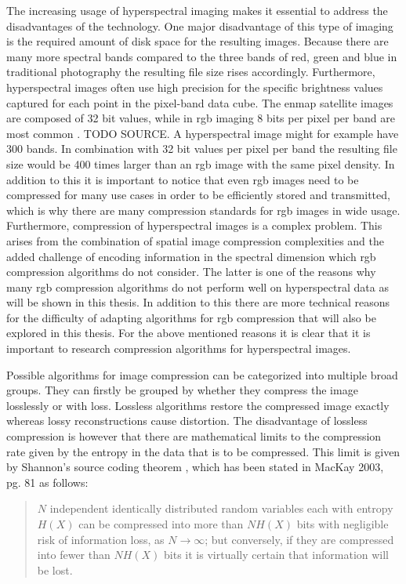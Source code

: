 The increasing usage of hyperspectral imaging makes it essential to address the disadvantages of the technology. One major disadvantage of this type of imaging is the required amount of disk space for the resulting images. Because there are many more spectral bands compared to the three bands of red, green and blue in traditional photography the resulting file size rises accordingly. Furthermore, hyperspectral images often use high precision for the specific brightness values captured for each point in the pixel-band data cube. The \ac{enmap} satellite images are composed of 32 bit values, while in \ac{rgb} imaging 8 bits per pixel per band are most common \citep{guanter_enmap_2015}. TODO SOURCE. A hyperspectral image might for example have 300 bands. In combination with 32 bit values per pixel per band the resulting file size would be 400 times larger than an \ac{rgb} image with the same pixel density. In addition to this it is important to notice that even \ac{rgb} images need to be compressed for many use cases in order to be efficiently stored and transmitted, which is why there are many compression standards for \ac{rgb} images in wide usage.
Furthermore, compression of hyperspectral images is a complex problem. This arises from the combination of spatial image compression complexities and the added challenge of encoding information in the spectral dimension which \ac{rgb} compression algorithms do not consider. The latter is one of the reasons why many \ac{rgb} compression algorithms do not perform well on hyperspectral data as will be shown in this thesis. In addition to this there are more technical reasons for the difficulty of adapting algorithms for \ac{rgb} compression that will also be explored in this thesis. For the above mentioned reasons it is clear that it is important to research compression algorithms for hyperspectral images.

Possible algorithms for image compression can be categorized into multiple broad groups. They can firstly be grouped by whether they compress the image losslessly or with loss. Lossless algorithms restore the compressed image exactly whereas lossy reconstructions cause distortion. The disadvantage of lossless compression is however that there are mathematical limits to the compression rate given by the entropy in the data that is to be compressed. This limit is given by Shannon's source coding theorem \citep{shannon_mathematical_1948}, which has been stated in MacKay 2003, pg. 81 \citep{mackay_information_2003} as follows:

\begin{quotation}
$N$ independent identically distributed random variables each with entropy $H(X)$ can be compressed into more than $NH(X)$ bits with negligible risk of information loss, as $N \rightarrow \infty$; but conversely, if they are compressed into fewer than $NH(X)$ bits it is virtually certain that information will be lost.
\end{quotation}

